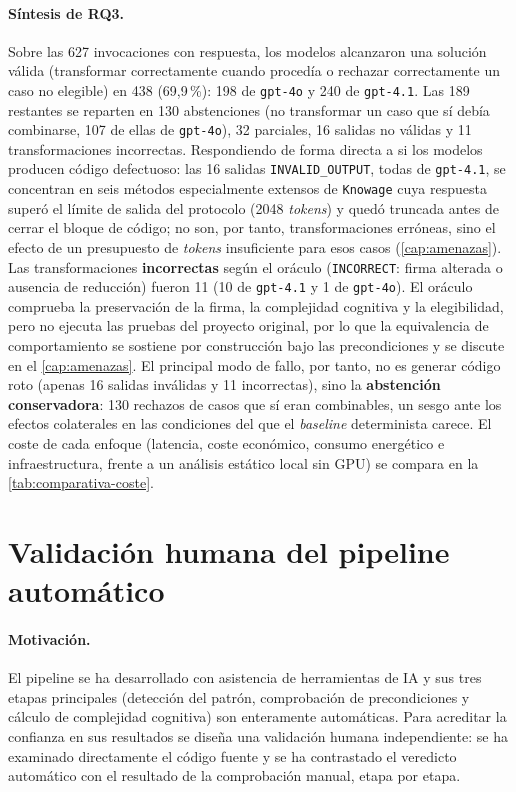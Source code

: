 \paragraph{Síntesis de RQ3.} Sobre las 627 invocaciones con respuesta, los
modelos alcanzaron una solución válida (transformar correctamente cuando
procedía o rechazar correctamente un caso no elegible) en 438 (69{,}9\,\%):
198 de \texttt{gpt-4o} y 240 de \texttt{gpt-4.1}. Las 189 restantes se reparten
en 130 abstenciones (no transformar un caso que sí debía combinarse, 107 de
ellas de \texttt{gpt-4o}), 32 parciales, 16 salidas no válidas y 11
transformaciones incorrectas. Respondiendo de forma directa a si los modelos
producen código defectuoso: las 16 salidas \texttt{INVALID\_OUTPUT}, todas de
\texttt{gpt-4.1}, se concentran en seis métodos especialmente extensos de
\texttt{Knowage} cuya respuesta superó el límite de salida del protocolo
(2048 \emph{tokens}) y quedó truncada antes de cerrar el bloque de código; no
son, por tanto, transformaciones erróneas, sino el efecto de un presupuesto de
\emph{tokens} insuficiente para esos casos (\autoref{cap:amenazas}). Las
transformaciones \textbf{incorrectas} según el oráculo (\texttt{INCORRECT}:
firma alterada o ausencia de reducción) fueron 11 (10 de \texttt{gpt-4.1} y 1 de
\texttt{gpt-4o}). El oráculo comprueba la preservación de la firma, la
complejidad cognitiva y la elegibilidad, pero no ejecuta las pruebas del
proyecto original, por lo que la equivalencia de comportamiento se sostiene por
construcción bajo las precondiciones y se discute en el \autoref{cap:amenazas}.
El principal modo de fallo, por tanto, no es generar código roto (apenas 16
salidas inválidas y 11 incorrectas), sino la \textbf{abstención conservadora}:
130 rechazos de casos que sí eran combinables, un sesgo ante los efectos
colaterales en las condiciones del que el \emph{baseline} determinista carece. El coste de cada enfoque (latencia, coste económico,
consumo energético e infraestructura, frente a un análisis estático local sin
GPU) se compara en la \autoref{tab:comparativa-coste}.

\section{Validación humana del pipeline automático}
\label{sec:validacion-humana}

\paragraph{Motivación.}
El pipeline se ha desarrollado con asistencia de herramientas de IA y sus tres
etapas principales (detección del patrón, comprobación de precondiciones y
cálculo de complejidad cognitiva) son enteramente automáticas. Para acreditar la
confianza en sus resultados se diseña una validación humana independiente: 
se ha examinado directamente el código fuente y se ha contrastado el veredicto automático
con el resultado de la comprobación manual, etapa por etapa.

